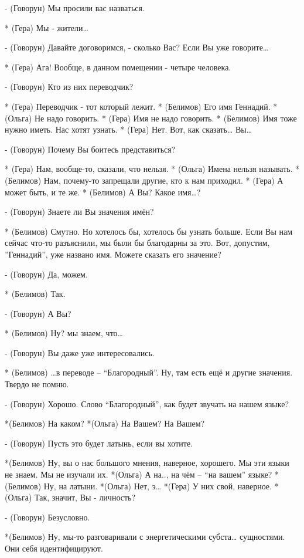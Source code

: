 - (Говорун) Мы просили вас назваться.

* (Гера) Мы - жители…

- (Говорун) Давайте договоримся, - сколько Вас? Если Вы уже говорите…

* (Гера) Ага! Вообще, в данном помещении - четыре человека.

- (Говорун) Кто из них переводчик?

* (Гера) Переводчик - тот который лежит.
* (Белимов) Его имя Геннадий.
* (Ольга) Не надо говорить.
* (Гера) Имя не надо говорить.
* (Белимов) Имя тоже нужно иметь. Нас хотят узнать.
* (Гера) Нет. Вот, как сказать… Вы…

- (Говорун) Почему Вы боитесь представиться?

* (Гера) Нам, вообще-то, сказали, что нельзя.
* (Ольга) Имена нельзя называть.
* (Белимов) Нам, почему-то запрещали  другие, кто к нам приходил.
* (Гера) А может быть, и те же.
* (Белимов) А Вы? Какое имя…?

- (Говорун) Знаете ли Вы значения имён?

* (Белимов) Смутно. Но хотелось бы, хотелось бы узнать больше. Если Вы нам сейчас что-то разъяснили, мы были бы благодарны за это. Вот, допустим, ”Геннадий”, уже названо имя. Можете сказать его значение?

- (Говорун) Да, можем.

* (Белимов) Так.

- (Говорун) А Вы?

* (Белимов) Ну? мы знаем, что…

- (Говорун) Вы даже уже интересовались.

* (Белимов) …в переводе – “Благородный”. Ну, там есть ещё и другие значения. Твердо не помню.

- (Говорун) Хорошо. Слово “Благородный”, как будет звучать на нашем языке?

*(Белимов) На каком?
*(Ольга) На Вашем?  На Вашем?

- (Говорун) Пусть это будет латынь, если вы хотите.

*(Белимов) Ну, вы о нас большого мнения, наверное, хорошего. Мы эти языки не знаем. Мы не изучали их.
*(Ольга) А на.., на чём – “на вашем” языке?
*(Белимов) Ну, на латыни.
*(Ольга) Нет, э…
*(Гера) У них свой, наверное.
*(Ольга) Так, значит, Вы - личность?

- (Говорун) Безусловно.

*(Белимов) Ну, мы-то разговаривали с энергетическими субста… сущностями. Они себя идентифицируют.

